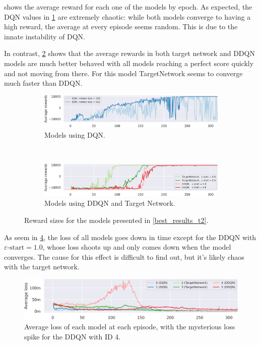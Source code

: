  shows the average reward for each one of the models by epoch.
As expected, the DQN values in \cref{dqn_avg_reward} are extremely chaotic: while both models converge to having a high reward, the average at every episode seems random.
This is due to the innate instability of DQN\cite{reinforcement_learning_introduction}.

In contrast, \cref{rest_avg_reward} shows that the average rewards in both target network and DDQN models are much better behaved with all models reaching a perfect score quickly and not moving from there.
For this model TargetNetwork seems to converge much faster than DDQN.

\begin{figure}[h]
	\begin{subfigure}{\textwidth}
		\includegraphics[width=\textwidth]{dqn_reward_size.png}
		\caption{Models using DQN.}
		\label{dqn_avg_reward}
	\end{subfigure} \\[1ex]
	\begin{subfigure}{\textwidth}
		\includegraphics[width=\textwidth]{rest_reward_size.png}
		\caption{Models using DDQN and Target Network.}
		\label{rest_avg_reward}
	\end{subfigure}
	\caption{Reward sizes for the models presented in \cref{best_results_t2}.}
	\label{avg_reward}
\end{figure}

As seem in \cref{losses}, the loss of all models goes down in time except for the DDQN with $\varepsilon\text{-start} = 1.0$, whose loss shoots up and only comes down when the model converges.
The cause for this effect is difficult to find out, but it's likely chaos with the target network.
\begin{figure}[h]
	\includegraphics[width=\textwidth]{losses.png}
	\caption{Average loss of each model at each episode, with the mysterious loss spike for the DDQN with ID 4.}
	\label{losses}
\end{figure}

